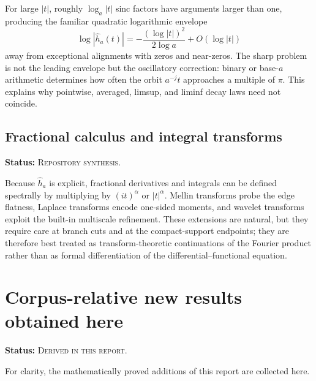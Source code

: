 \documentclass[11pt]{article}
\theoremstyle{definition}
\theoremstyle{remark}
\newcommand{\RepoStatus}{\textcolor{RepoOlive}{\textsc{Repository synthesis}}}
\newcommand{\DerivedStatus}{\textcolor{DerivedPurple}{\textsc{Derived in this report}}}
\newcommand{\status}[1]{\par\smallskip\noindent\textbf{Status:} #1.\par\smallskip}
\begin{document}
For large \(|t|\), roughly \(\log_a|t|\) sinc factors have arguments larger than one, producing the familiar quadratic logarithmic envelope
\begin{equation}
  \log|\widehat h_a(t)|
  =-\frac{(\log|t|)^2}{2\log a}+O(\log|t|)
  \label{eq:rough-fourier-envelope}
\end{equation}
away from exceptional alignments with zeros and near-zeros.  The sharp problem is not the leading envelope but the oscillatory correction: binary or base-\(a\) arithmetic determines how often the orbit \(a^{-j}t\) approaches a multiple of \(\pi\).  This explains why pointwise, averaged, limsup, and liminf decay laws need not coincide.

\subsection{Fractional calculus and integral transforms}
\status{\RepoStatus}

Because \(\widehat h_a\) is explicit, fractional derivatives and integrals can be defined spectrally by multiplying by \((it)^\alpha\) or \(|t|^\alpha\).  Mellin transforms probe the edge flatness, Laplace transforms encode one-sided moments, and wavelet transforms exploit the built-in multiscale refinement.  These extensions are natural, but they require care at branch cuts and at the compact-support endpoints; they are therefore best treated as transform-theoretic continuations of the Fourier product rather than as formal differentiation of the differential--functional equation.

\section{Corpus-relative new results obtained here}
\label{sec:new-results}
\status{\DerivedStatus}

For clarity, the mathematically proved additions of this report are collected here.
\end{document}
